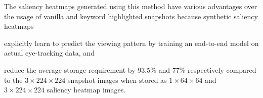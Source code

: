 The saliency heatmaps generated using this method have various advantages over the usage of vanilla and keyword highlighted snapshots because synthetic saliency heatmaps
\begin{inparaenum}[(i)]
\item explicitly learn to predict the viewing pattern by training an end-to-end model on actual eye-tracking data, and 
\item reduce the average storage requirement by $93.5\%$ and $77\%$ respectively compared to the $3\times224\times224$ snapshot images when stored as $1\times64\times64$ and $3\times224\times224$ saliency heatmap images.
\end{inparaenum}

